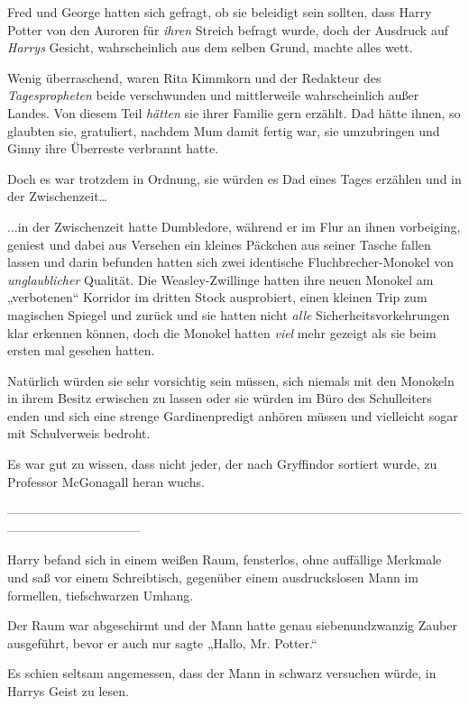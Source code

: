 {Fred und George hatten sich gefragt, ob sie beleidigt sein sollten, dass Harry Potter von den Auroren für \emph{ihren} Streich befragt wurde, doch der Ausdruck auf \emph{Harrys} Gesicht, wahrscheinlich aus dem selben Grund, machte alles wett.

Wenig überraschend, waren Rita Kimmkorn und der Redakteur des \emph{Tagespropheten} beide verschwunden und mittlerweile wahrscheinlich außer Landes. Von diesem Teil \emph{hätten} sie ihrer Familie gern erzählt. Dad hätte ihnen, so glaubten sie, gratuliert, nachdem Mum damit fertig war, sie umzubringen und Ginny ihre Überreste verbrannt hatte.

Doch es war trotzdem in Ordnung, sie würden es Dad eines Tages erzählen und in der Zwischenzeit…

...in der Zwischenzeit hatte Dumbledore, während er im Flur an ihnen vorbeiging, geniest und dabei aus Versehen ein kleines Päckchen aus seiner Tasche fallen lassen und darin befunden hatten sich zwei identische Fluchbrecher-Monokel von \emph{unglaublicher} Qualität. Die Weasley-Zwillinge hatten ihre neuen Monokel am „verbotenen“ Korridor im dritten Stock ausprobiert, einen kleinen Trip zum magischen Spiegel und zurück und sie hatten nicht \emph{alle} Sicherheitsvorkehrungen klar erkennen können, doch die Monokel hatten \emph{viel} mehr gezeigt als sie beim ersten mal gesehen hatten.

Natürlich würden sie sehr vorsichtig sein müssen, sich niemals mit den Monokeln in ihrem Besitz erwischen zu lassen oder sie würden im Büro des Schulleiters enden und sich eine strenge Gardinenpredigt anhören müssen und vielleicht sogar mit Schulverweis bedroht.

Es war gut zu wissen, dass nicht jeder, der nach Gryffindor sortiert wurde, zu Professor McGonagall heran wuchs.

--------------------------------------------------------------------------------------------------------------------------------------------

\hfill\break Harry befand sich in einem weißen Raum, fensterlos, ohne auffällige Merkmale und saß vor einem Schreibtisch, gegenüber einem ausdruckslosen Mann im formellen, tiefschwarzen Umhang.

Der Raum war abgeschirmt und der Mann hatte genau siebenundzwanzig Zauber ausgeführt, bevor er auch nur sagte „Hallo, Mr. Potter.“

Es schien seltsam angemessen, dass der Mann in schwarz versuchen würde, in Harrys Geist zu lesen.

}
